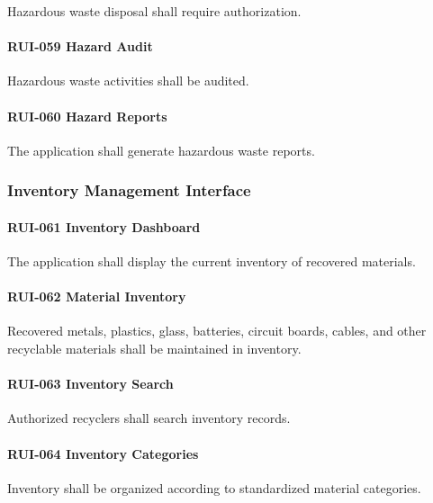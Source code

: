 Hazardous waste disposal shall require authorization.

\paragraph{RUI-059 Hazard Audit}

Hazardous waste activities shall be audited.

\paragraph{RUI-060 Hazard Reports}

The application shall generate hazardous waste reports.


\subsubsection*{Inventory Management Interface}

\paragraph{RUI-061 Inventory Dashboard}

The application shall display the current inventory of recovered
materials.

\paragraph{RUI-062 Material Inventory}

Recovered metals, plastics, glass, batteries, circuit boards, cables,
and other recyclable materials shall be maintained in inventory.

\paragraph{RUI-063 Inventory Search}

Authorized recyclers shall search inventory records.

\paragraph{RUI-064 Inventory Categories}

Inventory shall be organized according to standardized material
categories.

